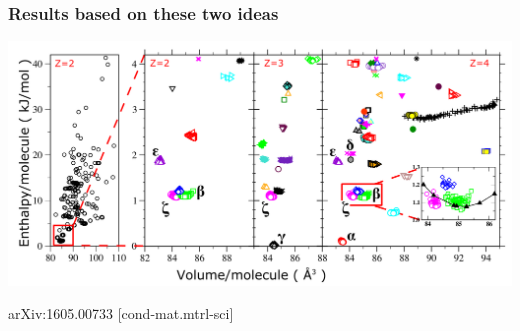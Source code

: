 \documentclass[12pt,notes=off,unicode]{beamer}
\begin{document}
    \begin{frame}[c]\frametitle{Results based on these two ideas}
        
      \includegraphics[width=\textwidth]{emine_paper}
      \par\hfill \tiny arXiv:1605.00733 [cond-mat.mtrl-sci]

    \end{frame}

\end{document}
